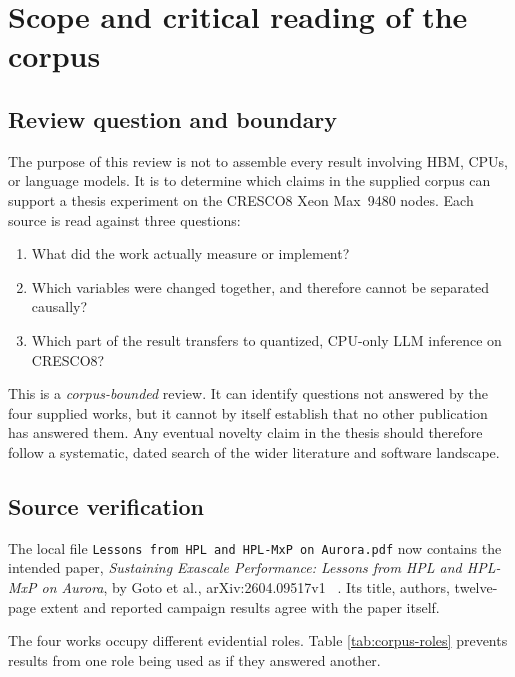 \section{Scope and critical reading of the corpus}
\label{sec:corpus}

\subsection{Review question and boundary}

The purpose of this review is not to assemble every result involving
HBM, CPUs, or language models.  It is to determine which claims in the
supplied corpus can support a thesis experiment on the CRESCO8 Xeon
Max~9480 nodes.  Each source is read against three questions:

\begin{enumerate}
  \item What did the work actually measure or implement?
  \item Which variables were changed together, and therefore cannot be
        separated causally?
  \item Which part of the result transfers to quantized, CPU-only LLM
        inference on CRESCO8?
\end{enumerate}

This is a \emph{corpus-bounded} review.  It can identify questions not
answered by the four supplied works, but it cannot by itself establish
that no other publication has answered them.  Any eventual novelty
claim in the thesis should therefore follow a systematic, dated search
of the wider literature and software landscape.

\subsection{Source verification}

The local file
\texttt{Lessons from HPL and HPL-MxP on Aurora.pdf} now contains the
intended paper, \emph{Sustaining Exascale Performance: Lessons from HPL
and HPL-MxP on Aurora}, by Goto et al., arXiv:2604.09517v1
~\cite{goto2026aurorahpl}.  Its title, authors, twelve-page extent and
reported campaign results agree with the paper itself.

The four works occupy different evidential roles.  Table
\ref{tab:corpus-roles} prevents results from one role being used as if
they answered another.

